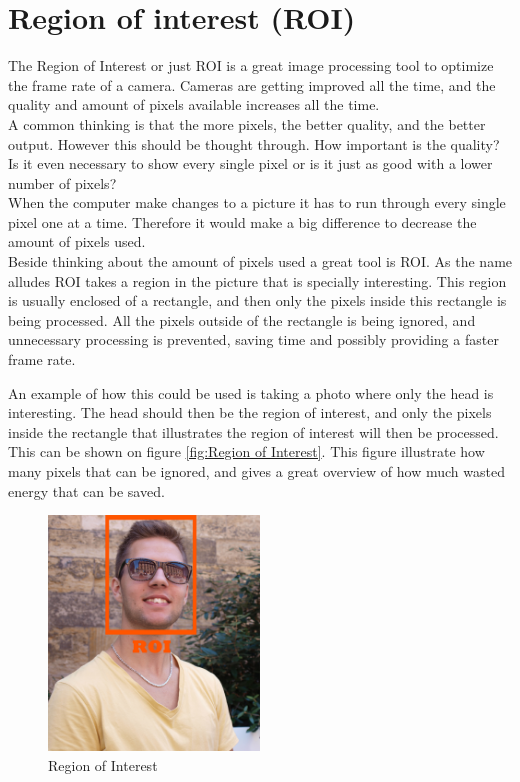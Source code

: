 \section{Region of interest (ROI)}
The Region of Interest or just ROI is a great image processing tool to optimize the frame rate of a camera. Cameras are getting improved all the time, and the quality and amount of pixels available increases all the time. \\
A common thinking is that the more pixels, the better quality, and the better output. However this should be thought through. How important is the quality? Is it even necessary to show every single pixel or is it just as good with a lower number of pixels?\\
When the computer make changes to a picture it has to run through every single pixel one at a time. Therefore it would make a big difference to decrease the amount of pixels used.\\
Beside thinking about the amount of pixels used a great tool is ROI. As the name alludes ROI takes a region in the picture that is specially interesting. This region is usually enclosed of a rectangle, and then only the pixels inside this rectangle is being processed. All the pixels outside of the rectangle is being ignored, and unnecessary processing is prevented, saving time and possibly providing a faster frame rate.

An example of how this could be used is taking a photo where only the head is interesting. The head should then be the region of interest, and only the pixels inside the rectangle that illustrates the region of interest will then be processed. This can be shown on figure \eqref{fig:Region of Interest}. This figure illustrate how many pixels that can be ignored, and gives a great overview of how much wasted energy that can be saved.

\begin{figure}[htbp] 
\centering 
\includegraphics[width=0.5\textwidth]{Pictures/Theory/RegionOfInterest.jpg} 
\caption{Region of Interest} 
\label{fig:Region of Interest} 
\end{figure} 

